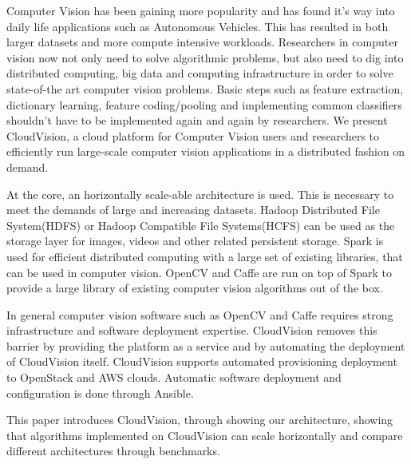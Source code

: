 \begin{eabstract}
    Computer Vision has been gaining more popularity and has found it’s way into daily
    life applications such as Autonomous Vehicles. This has resulted in both larger
    datasets and more compute intensive workloads. Researchers in computer vision now
    not only need to solve algorithmic problems, but also need to dig into distributed
    computing, big data and computing infrastructure in order to solve state-of-the art
    computer vision problems. Basic steps such as feature extraction, dictionary learning,
    feature coding/pooling and implementing common classifiers shouldn’t have to be
    implemented again and again by researchers. We present CloudVision, a cloud platform
    for Computer Vision users and researchers to efficiently run large-scale computer
    vision applications in a distributed fashion on demand.

    At the core, an horizontally scale-able architecture is used. This is necessary to
    meet the demands of large and increasing datasets. Hadoop Distributed File System(HDFS)
    or Hadoop Compatible File Systems(HCFS) can be used as the storage layer for images, videos
    and other related persistent storage. Spark is used for efficient distributed computing
    with a large set of existing libraries, that can be used in computer vision. OpenCV and Caffe
    are run on top of Spark to provide a large library of existing computer vision algorithms
    out of the box.

    In general computer vision software such as OpenCV and Caffe requires strong
    infrastructure and software deployment expertise. CloudVision removes this barrier by
    providing the platform as a service and by automating the deployment of CloudVision
    itself. CloudVision supports automated provisioning deployment to OpenStack and AWS
    clouds. Automatic software deployment and configuration is done through Ansible.

    This paper introduces CloudVision, through showing our architecture, showing that
    algorithms implemented on CloudVision can scale horizontally and compare different
    architectures through benchmarks.

\end{eabstract}

